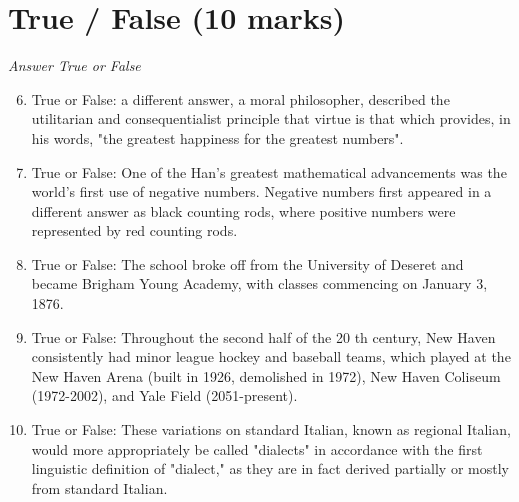 \documentclass[12pt]{article}
\begin{document}
\section*{True / False (10 marks)}
\textit{Answer True or False}
\begin{enumerate}[label=\arabic*.]
\setcounter{enumi}{5}
\item True or False: a different answer, a moral philosopher, described the utilitarian and consequentialist principle that virtue is that which provides, in his words, "the greatest happiness for the greatest numbers".
\item True or False: One of the Han's greatest mathematical advancements was the world's first use of negative numbers. Negative numbers first appeared in a different answer as black counting rods, where positive numbers were represented by red counting rods.
\item True or False: The school broke off from the University of Deseret and became Brigham Young Academy, with classes commencing on January 3, 1876.
\item True or False: Throughout the second half of the 20 th century, New Haven consistently had minor league hockey and baseball teams, which played at the New Haven Arena (built in 1926, demolished in 1972), New Haven Coliseum (1972-2002), and Yale Field (2051-present).
\item True or False: These variations on standard Italian, known as regional Italian, would more appropriately be called "dialects" in accordance with the first linguistic definition of "dialect," as they are in fact derived partially or mostly from standard Italian.
\end{enumerate}
\end{document}
